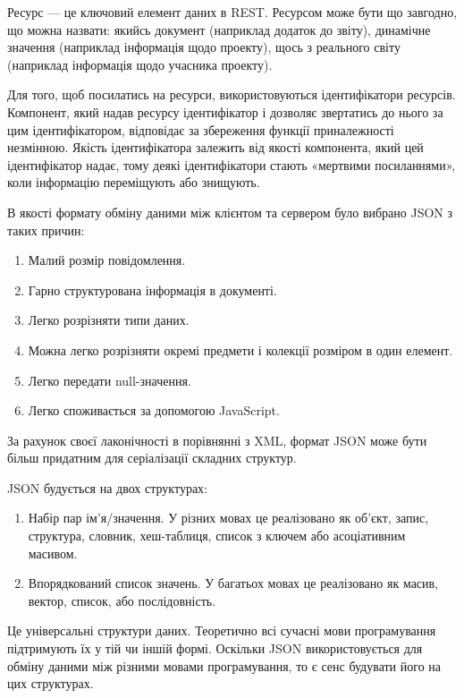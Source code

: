 \documentclass[../main.tex]{subfiles}
\begin{document}
Ресурс — це ключовий елемент даних в REST. Ресурсом може бути що завгодно, що можна назвати: якийсь документ (наприклад додаток до звіту), динамічне значення (наприклад інформація щодо проекту), щось з реального світу (наприклад інформація щодо учасника проекту).

Для того, щоб посилатись на ресурси, використовуються ідентифікатори ресурсів. Компонент, який надав ресурсу ідентифікатор і дозволяє звертатись до нього за цим ідентифікатором, відповідає за збереження функції приналежності незмінною. Якість ідентифікатора залежить від якості компонента, який цей ідентифікатор надає, тому деякі ідентифікатори стають «мертвими посиланнями», коли інформацію переміщують або знищують.

В якості формату обміну даними між клієнтом та сервером було вибрано JSON з таких причин:
\begin{enumerate}
	\item Малий розмір повідомлення.
	\item Гарно структурована інформація в документі.
	\item Легко розрізняти типи даних.
	\item Можна легко розрізняти окремі предмети і колекції розміром в один елемент.
	\item Легко передати null-значення.
	\item Легко споживається %
	за допомогою JavaScript.
\end{enumerate}

За рахунок своєї лаконічності в порівнянні з XML, формат JSON може бути більш придатним для серіалізації складних структур.

JSON будується на двох структурах:
\begin{enumerate}
	\item Набір пар ім'я/значення. У різних мовах це реалізовано як об'єкт, запис, структура, словник, хеш-таблиця, список з ключем або асоціативним масивом. %
	\item Впорядкований список значень. У багатьох мовах це реалізовано як масив, вектор, список, або послідовність.
\end{enumerate}

Це універсальні структури даних. Теоретично всі сучасні мови програмування підтримують їх у тій чи іншій формі. Оскільки JSON використовується для обміну даними між різними мовами програмування, то є сенс будувати його на цих структурах.
\end{document}
